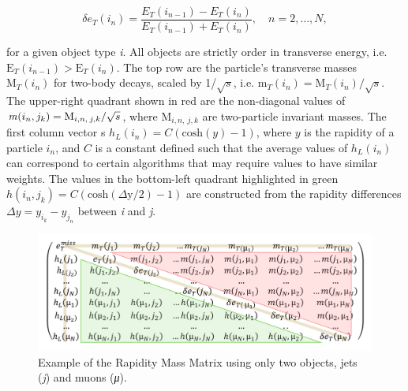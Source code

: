 \begin{equation}\label{eq:6.4}
\delta e_T(i_n) = \frac{E_T(i_{n-1})-E_T(i_{n})}{E_T(i_{n-1})+E_T(i_{n})}, \quad n=2,\ldots, N,  
\tag{6.4}
\end{equation}

for a given object type \textit{i}. All objects are strictly order in transverse energy, i.e. $\textrm{E}_T(i_{n-1})>\textrm{E}_T(i_{n})$. The top row are the particle's transverse masses $\textrm{M}_T(i_n)$
for two-body decays, scaled by 1/$\sqrt{s}$, i.e.  $\textrm{m}_T(i_n)=\textrm{M}_T(i_n)/\sqrt{s}$.
The upper-right quadrant shown in red are the non-diagonal values of $\textrm{\textit{m}}(i_n,j_k)=\textrm{M}_{i,n,\> j,k}/\sqrt{s}$, where $\textrm{M}_{i,n,\> j,k}$ are two-particle invariant masses. 
The first column vector s $h_L(i_n) = C (\textrm{cosh}(y)-1)$, where $y$ is the rapidity of a particle $i_n$, and $C$ is a constant defined such that the average 
values of $h_L(i_n)$ can correspond to certain algorithms that may require values to have similar weights. The values in the bottom-left quadrant highlighted in green $h(i_n,j_k)=C( \textrm{cosh}(\Delta \textrm{y} / \textrm{2}  )-\textrm{1} )$ 
are constructed from the rapidity differences $\Delta y=y_{i_k} - y_{j_n}$ between \textit{i} and \textit{j}.

\begin{figure}[ht]
    \centering
    \includegraphics[scale=0.68]{figs/ch6/rmm/RMM.png}
    \caption{ Example of the Rapidity Mass Matrix using only two objects, jets (\textit{j}) and muons (\textit{μ}).}
\label{fig:rmm}
\end{figure}

